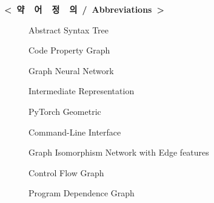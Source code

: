 \clearpage

\vspace*{0px}
\tableofcontents
\clearpage

\vspace*{0px}
\listoffigures
\clearpage

\vspace*{0px}
\listoftables
\clearpage


\vspace*{0px}
\begin{center}
  {\large\bfseries \textless\ 약\ \ 어\ \ 정\ \ 의\ /\ Abbreviations\ \textgreater}
\end{center}
\vspace{1em}

\begin{description}
  \item[\abbrAST] Abstract Syntax Tree
  \item[\abbrCPG] Code Property Graph
  \item[\abbrGNN] Graph Neural Network
  \item[\abbrIR] Intermediate Representation
  \item[\abbrPyG] PyTorch Geometric
  \item[\abbrCLI] Command-Line Interface
\item[\abbrGINE] Graph Isomorphism Network with Edge features
  \item[\abbrCFG] Control Flow Graph
  \item[\abbrPDG] Program Dependence Graph
\end{description}

